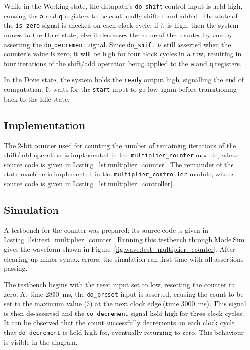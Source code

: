 \documentclass[a4paper]{article}
\begin{document}
While in the Working state, the datapath's \texttt{do\_shift} control input is held high, causing the \texttt{a} and \texttt{q} registers to be continually shifted and added. The state of the \texttt{is\_zero} signal is checked on each clock cycle; if it is high, then the system moves to the Done state, else it decreases the value of the counter by one by asserting the \texttt{do\_decrement} signal. Since \texttt{do\_shift} is still asserted when the counter's value is zero, it will be high for four clock cycles in a row, resulting in four iterations of the shift/add operation being applied to the \texttt{a} and \texttt{q} registers.

In the Done state, the system holds the \texttt{ready} output high, signalling the end of computation. It waits for the \texttt{start} input to go low again before transitioning back to the Idle state.

\subsection{Implementation}
\label{sec:seq:impl}

The 2-bit counter used for counting the number of remaining iterations of the shift/add operation is implemented in the \texttt{multiplier\_counter} module, whose source code is given in Listing~\ref{lst:multiplier_counter}. The remainder of the state machine is implemented in the \texttt{multiplier\_controller} module, whose source code is given in Listing~\ref{lst:multiplier_controller}.

\subsection{Simulation}
\label{sec:seq:sim}

A testbench for the counter was prepared; its source code is given in Listing~\ref{lst:test_multiplier_counter}. Running this testbench through ModelSim gives the waveform shown in Figure~\ref{fig:wave:test_multiplier_counter}. After cleaning up minor syntax errors, the simulation ran first time with all assertions passing.

The testbench begins with the reset input set to low, resetting the counter to zero. At time \SI{2800}{\milli\second}, the \texttt{do\_preset} input is asserted, causing the count to be set to the maximum value (3) at the next clock edge (time \SI{3000}{\milli\second}). This signal is then de-asserted and the \texttt{do\_decrement} signal held high for three clock cycles. It can be observed that the count successfully decrements on each clock cycle that \texttt{do\_decrement} is held high for, eventually returning to zero. This behaviour is visible in the diagram.
\end{document}
